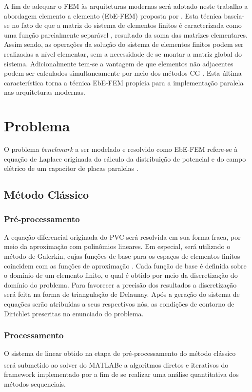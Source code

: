 \documentclass[
    12pt,               %
    openright,          %
    oneside,
    a4paper,            %
    english,            %
    french,             %
    spanish,            %
    brazil              %
    ]{abntex2}
\newcommand{\matlab}{MATLAB\textsuperscript{\textregistered}}
\begin{document}
	A fim de adequar o FEM às arquiteturas modernas será adotado neste trabalho a abordagem elemento a elemento (EbE-FEM) proposta por . Esta técnica baseia-se no fato de que a matriz do sistema de elementos finitos é caracterizada como uma função parcialmente separável \cite{Dayde1995}, resultado da soma das matrizes elementares. Assim sendo, as operações da solução do sistema de elementos finitos podem ser realizadas a nível elementar, sem a necessidade de se montar a matriz global do sistema. Adicionalmente tem-se a vantagem de que elementos não adjacentes podem ser calculados simultaneamente por meio dos métodos CG \cite{Wathen1989}. Esta última característica torna a técnica EbE-FEM propícia para a implementação paralela nas arquiteturas modernas.
	
	
	

	
\chapter{Problema}
	O problema \textit{benchmark} a ser modelado e resolvido como EbE-FEM refere-se à equação de Laplace originada do cálculo da distribuição de potencial e do campo elétrico de um capacitor de placas paralelas \cite[Exemplo 10.3]{boylestad2011}. 
	
	\section{Método Clássico}
	\subsection{Pré-processamento}
	
	A equação diferencial originada do PVC será resolvida em sua forma fraca, por meio da aproximação com polinômios lineares\cite{jin}. Em especial, será utilizado o método de Galerkin, cujas funções de base para os espaços de elementos finitos coincidem com as funções de aproximação \cite{jin}. Cada função de base é definida sobre o domínio de um elemento finito, o qual é obtido por meio da discretização  do domínio do problema. Para favorecer a precisão dos resultados a discretização será feita na forma de triangulação de Delaunay.	
	Após a geração do sistema de equações serão atribuídas a seus respectivos nós, as condições de contorno de Dirichlet prescritas no enunciado do problema. 
	
	\subsection{Processamento}
	O sistema de linear obtido na etapa de pré-processamento do método clássico será submetido ao solver do \matlab e a algoritmos diretos e iterativos do framework implementado por  a fim de se realizar uma análise quantitativa dos métodos sequenciais. 
	
\end{document}
